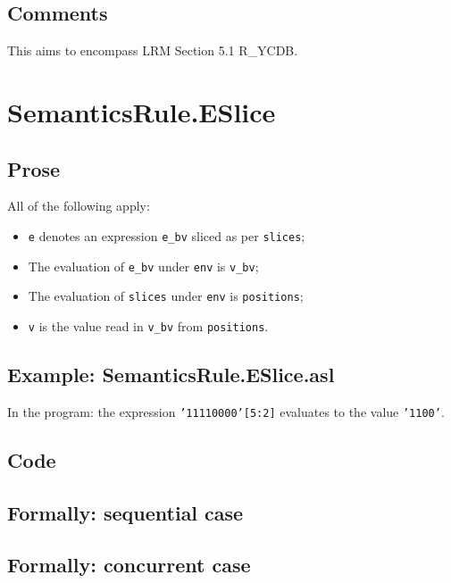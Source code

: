 \documentclass{book}
\begin{document}
  \subsection{Comments}
  This aims to encompass LRM Section 5.1 R\_YCDB.

\section{SemanticsRule.ESlice \label{sec:SemanticsRule.ESlice}}

  \subsection{Prose}
  All of the following apply:
  \begin{itemize}
  \item \texttt{e} denotes an expression \texttt{e\_bv} sliced as per \texttt{slices};
  \item The evaluation of \texttt{e\_bv} under \texttt{env} is \texttt{v\_bv};
  \item The evaluation of \texttt{slices} under \texttt{env} is \texttt{positions};
  \item \texttt{v} is the value read in \texttt{v\_bv} from \texttt{positions}.
  \end{itemize}

  \subsection{Example: SemanticsRule.ESlice.asl}
    In the program:
    the expression \texttt{'11110000'[5:2]} evaluates to the value \texttt{'1100'}.

  \subsection{Code}

\begin{emptyformal}
  \subsection{Formally: sequential case}

  \subsection{Formally: concurrent case}
\end{emptyformal}
\end{document}
